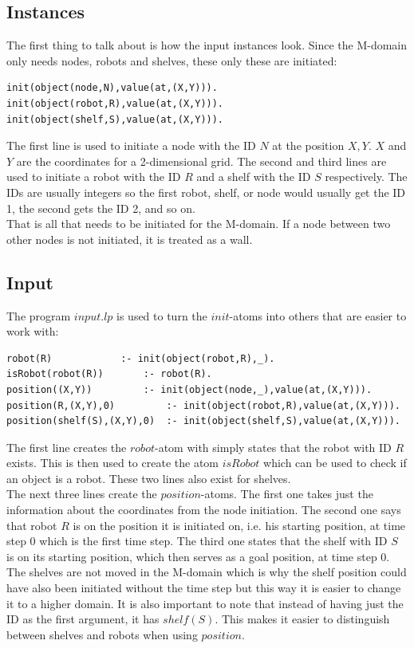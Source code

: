 \documentclass[runningheads]{llncs}
\begin{document}
\subsection{Instances}
The first thing to talk about is how the input instances look. Since the M-domain only needs nodes, robots and shelves, these only these are initiated:
\begin{verbatim}
init(object(node,N),value(at,(X,Y))).
init(object(robot,R),value(at,(X,Y))).
init(object(shelf,S),value(at,(X,Y))).
\end{verbatim}
The first line is used to initiate a node with the ID $N$ at the position $X, Y$. $X$ and $Y$ are the coordinates for a 2-dimensional grid. The second and third lines are used to initiate a robot with the ID $R$ and a shelf with the ID $S$ respectively. The IDs are usually integers so the first robot, shelf, or node would usually get the ID 1, the second gets the ID 2, and so on. \\
That is all that needs to be initiated for the M-domain. If a node between two other nodes is not initiated, it is treated as a wall.
\subsection{Input}
The program $input.lp$ is used to turn the $init$-atoms into others that are easier to work with:
\begin{verbatim}
robot(R) 			:- init(object(robot,R),_).
isRobot(robot(R)) 		:- robot(R).
position((X,Y))   		:- init(object(node,_),value(at,(X,Y))).
position(R,(X,Y),0) 		:- init(object(robot,R),value(at,(X,Y))).
position(shelf(S),(X,Y),0)	:- init(object(shelf,S),value(at,(X,Y))).
\end{verbatim}
The first line creates the $robot$-atom with simply states that the robot with ID $R$ exists. This is then used to create the atom $isRobot$ which can be used to check if an object is a robot. These two lines also exist for shelves. \\
The next three lines create the $position$-atoms. The first one takes just the information about the coordinates from the node initiation. The second one says that robot $R$ is on the position it is initiated on, i.e. his starting position, at time step 0 which is the first time step. The third one states that the shelf with ID $S$ is on its starting position, which then serves as a goal position, at time step 0. The shelves are not moved in the M-domain which is why the shelf position could have also been initiated without the time step but this way it is easier to change it to a higher domain. It is also important to note that instead of having just the ID as the first argument, it has $shelf(S)$. This makes it easier to distinguish between shelves and robots when using $position$.
\end{document}
